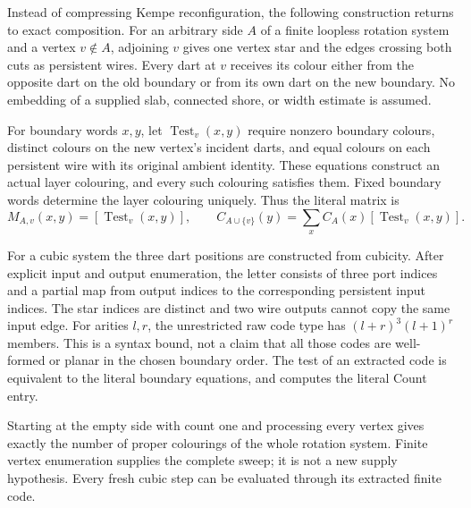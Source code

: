 Instead of compressing Kempe reconfiguration, the following construction
returns to exact composition. For an arbitrary side $A$ of a finite
loopless rotation system and a vertex $v\notin A$, adjoining $v$ gives one
vertex star and the edges crossing both cuts as persistent wires.
Every dart at $v$ receives its colour either from the opposite dart on
the old boundary or from its own dart on the new boundary. No embedding
of a supplied slab, connected shore, or width estimate is assumed.

For boundary words $x,y$, let $\operatorname{Test}_v(x,y)$ require nonzero
boundary colours, distinct colours on the new vertex's incident darts,
and equal colours on each persistent wire with its original ambient
identity. These equations construct an actual layer colouring, and every
such colouring satisfies them. Fixed boundary words determine the layer
colouring uniquely. Thus the literal matrix is
\[
 M_{A,v}(x,y)=[\operatorname{Test}_v(x,y)],\qquad
 C_{A\cup\{v\}}(y)=\sum_x C_A(x)[\operatorname{Test}_v(x,y)].
\]

For a cubic system the three dart positions are constructed from cubicity.
After explicit input and output enumeration, the letter consists of three
port indices and a partial map from output indices to the corresponding
persistent input indices. The star indices are distinct and two wire
outputs cannot copy the same input edge.
For arities $l,r$, the unrestricted raw code type has
$(l+r)^3(l+1)^r$ members. This is a syntax bound, not a claim that all
those codes are well-formed or planar in the chosen boundary order.
The test of an extracted code is equivalent to the literal boundary
equations, and computes the literal Count entry.

Starting at the empty side with count one and processing every vertex
gives exactly the number of proper colourings of the whole rotation
system. Finite vertex enumeration supplies the complete sweep; it is
not a new supply hypothesis. Every fresh cubic step can be evaluated
through its extracted finite code.

